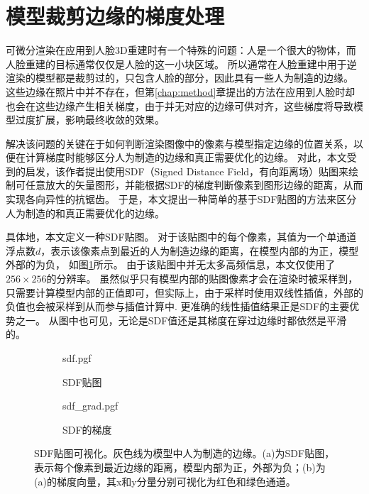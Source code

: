 \section{模型裁剪边缘的梯度处理}
\label{sec:recon_sdf}

可微分渲染在应用到人脸3D重建时有一个特殊的问题：人是一个很大的物体，而人脸重建的目标通常仅仅是人脸的这一小块区域。
所以通常在人脸重建中用于逆渲染的模型都是裁剪过的，只包含人脸的部分，因此具有一些人为制造的边缘。
这些边缘在照片中并不存在，但第\ref{chap:method}章提出的方法在应用到人脸时却也会在这些边缘产生相关梯度，由于并无对应的边缘可供对齐，这些梯度将导致模型过度扩展，影响最终收敛的效果。

解决该问题的关键在于如何判断渲染图像中的像素与模型指定边缘的位置关系，以便在计算梯度时能够区分人为制造的边缘和真正需要优化的边缘。
对此，本文受到\citet{sdf_glyphs}的启发，该作者提出使用SDF（Signed Distance Field，有向距离场）贴图来绘制可任意放大的矢量图形，并能根据SDF的梯度判断像素到图形边缘的距离，从而实现各向异性的抗锯齿。
于是，本文提出一种简单的基于SDF贴图的方法来区分人为制造的和真正需要优化的边缘。

具体地，本文定义一种SDF贴图。
对于该贴图中的每个像素，其值为一个单通道浮点数$d$，表示该像素点到最近的人为制造边缘的距离，在模型内部的为正，模型外部的为负，
如图\ref{fig:sdf}所示。
由于该贴图中并无太多高频信息，本文仅使用了$256 \times 256$的分辨率。
虽然似乎只有模型内部的贴图像素才会在渲染时被采样到，只需要计算模型内部的正值即可，但实际上，由于采样时使用双线性插值，外部的负值也会被采样到从而参与插值计算中.
更准确的线性插值结果正是SDF的主要优势之一。
从图中也可见，无论是SDF值还是其梯度在穿过边缘时都依然是平滑的。

\begin{figure}
\centering
\begin{subfigure}[t]{3.3in}
    \centering
    {sdf.pgf}
    \caption{SDF贴图}
    \label{fig:sdf}
\end{subfigure}
\begin{subfigure}[t]{2.9in}
    \centering
    {sdf_grad.pgf}
    \caption{SDF的梯度}
    \label{fig:sdf_grad}
\end{subfigure}
\caption[SDF贴图可视化]{SDF贴图可视化。灰色线为模型中人为制造的边缘。(a)为SDF贴图，表示每个像素到最近边缘的距离，模型内部为正，外部为负；(b)为(a)的梯度向量，其x和y分量分别可视化为红色和绿色通道。}
\end{figure}

